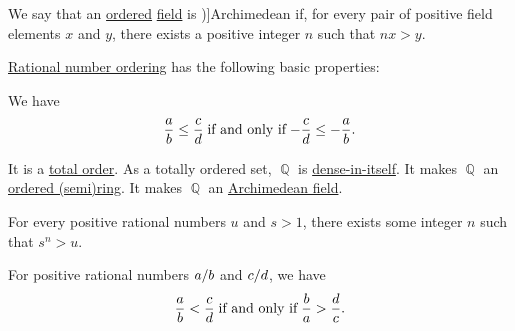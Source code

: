 \begin{definition}\label{def:archimedean_field}
  We say that an \hyperref[def:ordered_semiring]{ordered} \hyperref[def:field]{field} is \term[ru=архимедово кольцо(\cite[30]{Вечтомов2000})]{Archimedean} if, for every pair of positive field elements \( x \) and \( y \), there exists a positive integer \( n \) such that \( nx > y \).
\end{definition}

\begin{proposition}\label{thm:def:rational_number_ordering}
  \hyperref[def:rational_number_ordering]{Rational number ordering} has the following basic properties:
  \begin{thmenum}
     We have
    \begin{equation*}
      \frac a b \leq \frac c d \T{if and only if} -\frac c d \leq -\frac a b.
    \end{equation*}

     It is a \hyperref[def:totally_ordered_set]{total order}.
     As a totally ordered set, \( \BbbQ \) is \hyperref[def:dense_total_order]{dense-in-itself}.
     It makes \( \BbbQ \) an \hyperref[def:ordered_semiring]{ordered (semi)ring}.
     It makes \( \BbbQ \) an \hyperref[def:archimedean_field]{Archimedean field}.

     For every positive rational numbers \( u \) and \( s > 1 \), there exists some integer \( n \) such that \( s^n > u \).

     For positive rational numbers \( \ifrac a b \) and \( \ifrac c d \), we have
    \begin{equation}\label{eq:thm:def:rational_number_ordering/reciprocal}
      \frac a b < \frac c d \T{if and only if} \frac b a > \frac d c.
    \end{equation}
  \end{thmenum}
\end{proposition}
